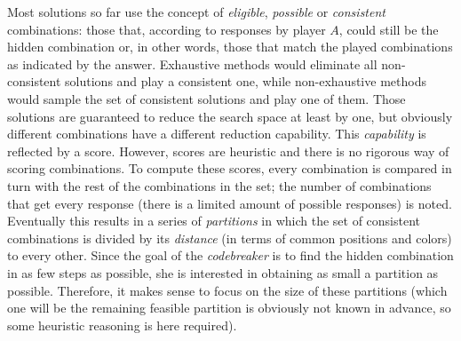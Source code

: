 \documentclass[conference]{IEEEtran}
\begin{document}
Most solutions so far \cite{o1991mastermind,francisstrategies:moo,Berghman20091880,nicso} use the concept of {\em
    eligible}, {\em possible} or {\em
  consistent} combinations: those that, according to responses by
player $A$, could still be the hidden combination or, in other
words, those that match the played combinations as indicated by the
answer. Exhaustive methods  \cite{Knuth,DBLP:journals/corr/abs-1207-1315} would eliminate all non-consistent
solutions and play a consistent one, while non-exhaustive methods
would sample the set of consistent solutions and play one of
them. Those solutions are guaranteed to reduce the search space at
least by one, but obviously different combinations have a different
reduction capability. This {\em capability} is reflected by a
score. However, scores are heuristic and there is no rigorous way of
scoring combinations. To compute these scores, every combination is
compared in turn with the rest of the combinations in the set; the
number of combinations that get every response (there is a limited
amount of possible responses) is noted. Eventually this results in a
series of {\em partitions} in which the set of consistent combinations
is divided by its {\em distance} (in terms of common positions and
colors) to every other.  Since the goal of the
{\em codebreaker} 
is to find the hidden combination in as few steps as
possible, she is interested in obtaining as small a partition as
possible. Therefore, it makes sense to focus on the size of these
partitions (which one will be the remaining feasible partition is
obviously not known in advance, so some heuristic reasoning is here
required). 
\end{document}
